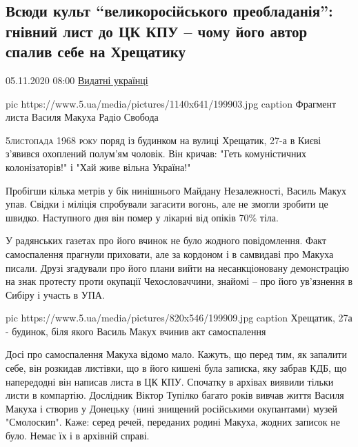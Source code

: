  
 
 

\subsection{Всюди культ \enquote{великоросійського преобладанія}: гнівний лист до ЦК КПУ – чому його автор спалив себе на Хрещатику}

05.11.2020 08:00 \href{https://www.5.ua/spetstemy/154/}{Видатні українці}


\ifcmt
pic https://www.5.ua/media/pictures/1140x641/199903.jpg
caption Фрагмент листа Василя Макуха Радіо Свобода
\fi

\lettrine[lines=3]{5}{листопада 1968 року} поряд із будинком на вулиці Хрещатик, 27-а в Києві
з'явився охоплений полум'ям чоловік. Він кричав: "Геть комуністичних
колонізаторів!" і "Хай живе вільна Україна!"

Пробігши кілька метрів у бік нинішнього Майдану Незалежності, Василь Макух
упав. Свідки і міліція спробували загасити вогонь, але не змогли зробити це
швидко. Наступного дня він помер у лікарні від опіків 70\% тіла.

У радянських газетах про його вчинок не було жодного повідомлення. Факт
самоспалення прагнули приховати, але за кордоном і в самвидаві про
Макуха писали. Друзі згадували про його плани вийти на несанкціоновану
демонстрацію на знак протесту проти окупації Чехословаччини, знайомі –
про його ув'язнення в Сибіру і участь в УПА.

\ifcmt
pic https://www.5.ua/media/pictures/820x546/199909.jpg
caption Хрещатик, 27а - будинок, біля якого Василь Макух вчинив акт самоспалення 
\fi

Досі про самоспалення Макуха відомо мало. Кажуть, що перед тим, як запалити
себе, він розкидав листівки, що в його кишені була записка, яку забрав КДБ, що
напередодні він написав листа в ЦК КПУ. Спочатку в архівах виявили тільки листи
в компартію. Дослідник Віктор Тупілко багато років вивчав життя Василя Макуха і
створив у Донецьку (нині знищений російськими окупантами) музей "Смолоскип".
Каже: серед речей, переданих родині Макуха, жодних записок не було. Немає їх і
в архівній справі.

